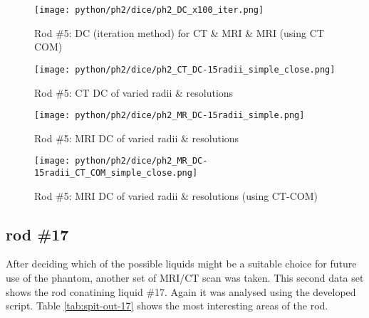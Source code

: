 \begin{figure}[!bp]
    \centering
    \texttt{[image: python/ph2/dice/ph2\_DC\_x100\_iter.png]}
    \caption{Rod \#5: DC (iteration method) for CT \& MRI \& MRI (using CT COM)}
    \label{fig:ph2_DC_x100}
\end{figure}

\begin{figure}[!bp]
  \centering
  \texttt{[image: python/ph2/dice/ph2\_CT\_DC-15radii\_simple\_close.png]}
  \caption{Rod \#5: CT DC of varied radii \& resolutions}
  \label{fig:ph2_CT_DC-15iter}
\end{figure}

\begin{figure}[!tbp]
  \centering
    \texttt{[image: python/ph2/dice/ph2\_MR\_DC-15radii\_simple.png]}
    \caption{Rod \#5: MRI DC of varied radii \& resolutions}
    \label{fig:ph2_MR_DC-15iter}
\end{figure}

\begin{figure}[!tbp]
      \centering
    \texttt{[image: python/ph2/dice/ph2\_MR\_DC-15radii\_CT\_COM\_simple\_close.png]}
    \caption{Rod \#5: MRI DC of varied radii \& resolutions (using CT-COM)}
    \label{fig:ph2_MR_CT-COM_DC-15iter}
\end{figure}

\clearpage



\subsection{rod \#17}

After deciding which of the possible liquids might be a suitable choice for future use of the phantom, another set of MRI/CT scan was taken.
This second data set shows the rod conatining liquid \#17.
Again it was analysed using the developed script.
Table \ref{tab:spit-out-17} shows the most interesting areas of the rod.

